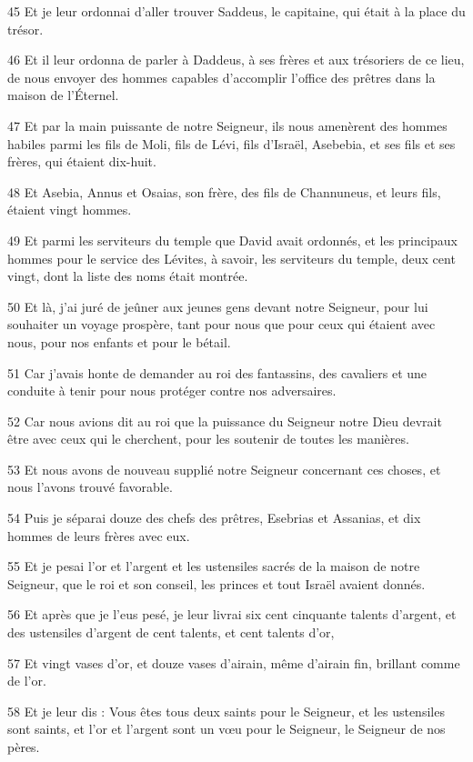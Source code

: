 \par 45 Et je leur ordonnai d'aller trouver Saddeus, le capitaine, qui était à la place du trésor.
\par 46 Et il leur ordonna de parler à Daddeus, à ses frères et aux trésoriers de ce lieu, de nous envoyer des hommes capables d'accomplir l'office des prêtres dans la maison de l'Éternel.
\par 47 Et par la main puissante de notre Seigneur, ils nous amenèrent des hommes habiles parmi les fils de Moli, fils de Lévi, fils d'Israël, Asebebia, et ses fils et ses frères, qui étaient dix-huit.
\par 48 Et Asebia, Annus et Osaias, son frère, des fils de Channuneus, et leurs fils, étaient vingt hommes.
\par 49 Et parmi les serviteurs du temple que David avait ordonnés, et les principaux hommes pour le service des Lévites, à savoir, les serviteurs du temple, deux cent vingt, dont la liste des noms était montrée.
\par 50 Et là, j'ai juré de jeûner aux jeunes gens devant notre Seigneur, pour lui souhaiter un voyage prospère, tant pour nous que pour ceux qui étaient avec nous, pour nos enfants et pour le bétail.
\par 51 Car j'avais honte de demander au roi des fantassins, des cavaliers et une conduite à tenir pour nous protéger contre nos adversaires.
\par 52 Car nous avions dit au roi que la puissance du Seigneur notre Dieu devrait être avec ceux qui le cherchent, pour les soutenir de toutes les manières.
\par 53 Et nous avons de nouveau supplié notre Seigneur concernant ces choses, et nous l'avons trouvé favorable.
\par 54 Puis je séparai douze des chefs des prêtres, Esebrias et Assanias, et dix hommes de leurs frères avec eux.
\par 55 Et je pesai l'or et l'argent et les ustensiles sacrés de la maison de notre Seigneur, que le roi et son conseil, les princes et tout Israël avaient donnés.
\par 56 Et après que je l'eus pesé, je leur livrai six cent cinquante talents d'argent, et des ustensiles d'argent de cent talents, et cent talents d'or,
\par 57 Et vingt vases d'or, et douze vases d'airain, même d'airain fin, brillant comme de l'or.
\par 58 Et je leur dis : Vous êtes tous deux saints pour le Seigneur, et les ustensiles sont saints, et l'or et l'argent sont un vœu pour le Seigneur, le Seigneur de nos pères.
